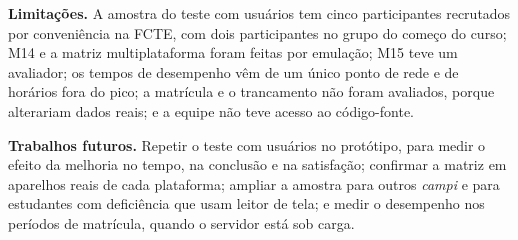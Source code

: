 \textbf{Limitações.} A amostra do teste com usuários tem cinco participantes recrutados por conveniência na FCTE, com dois participantes no grupo do começo do curso; M14 e a matriz multiplataforma foram feitas por emulação; M15 teve um avaliador; os tempos de desempenho vêm de um único ponto de rede e de horários fora do pico; a matrícula e o trancamento não foram avaliados, porque alterariam dados reais; e a equipe não teve acesso ao código-fonte.

\textbf{Trabalhos futuros.} Repetir o teste com usuários no protótipo, para medir o efeito da melhoria no tempo, na conclusão e na satisfação; confirmar a matriz em aparelhos reais de cada plataforma; ampliar a amostra para outros \textit{campi} e para estudantes com deficiência que usam leitor de tela; e medir o desempenho nos períodos de matrícula, quando o servidor está sob carga.
